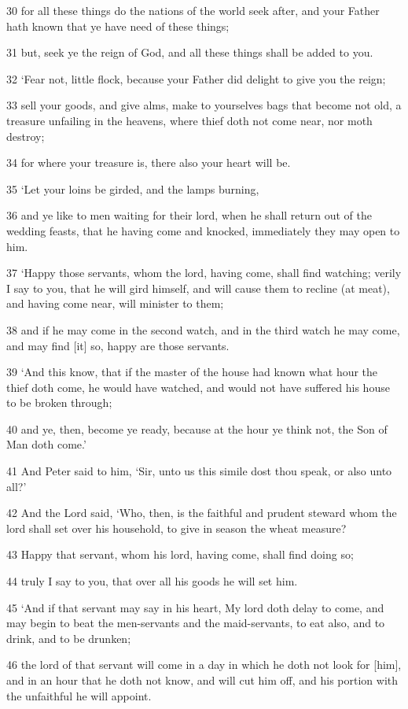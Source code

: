 \documentclass[11pt]{article}
\begin{document}
30 for all these things do the nations of the world seek after, and your Father hath known that ye have need of these things;

31 but, seek ye the reign of God, and all these things shall be added to you.

32 `Fear not, little flock, because your Father did delight to give you the reign;

33 sell your goods, and give alms, make to yourselves bags that become not old, a treasure unfailing in the heavens, where thief doth not come near, nor moth destroy;

34 for where your treasure is, there also your heart will be.

35 `Let your loins be girded, and the lamps burning,

36 and ye like to men waiting for their lord, when he shall return out of the wedding feasts, that he having come and knocked, immediately they may open to him.

37 `Happy those servants, whom the lord, having come, shall find watching; verily I say to you, that he will gird himself, and will cause them to recline (at meat), and having come near, will minister to them;

38 and if he may come in the second watch, and in the third watch he may come, and may find [it] so, happy are those servants.

39 `And this know, that if the master of the house had known what hour the thief doth come, he would have watched, and would not have suffered his house to be broken through;

40 and ye, then, become ye ready, because at the hour ye think not, the Son of Man doth come.'

41 And Peter said to him, `Sir, unto us this simile dost thou speak, or also unto all?'

42 And the Lord said, `Who, then, is the faithful and prudent steward whom the lord shall set over his household, to give in season the wheat measure?

43 Happy that servant, whom his lord, having come, shall find doing so;

44 truly I say to you, that over all his goods he will set him.

45 `And if that servant may say in his heart, My lord doth delay to come, and may begin to beat the men-servants and the maid-servants, to eat also, and to drink, and to be drunken;

46 the lord of that servant will come in a day in which he doth not look for [him], and in an hour that he doth not know, and will cut him off, and his portion with the unfaithful he will appoint.
\end{document}
